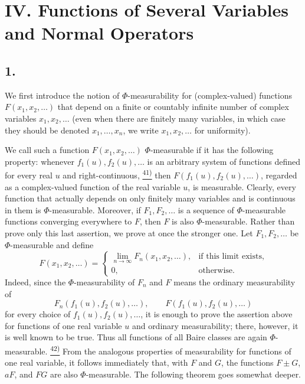 \documentclass[12pt,b5paper,twoside]{article}
\newcommand{\noteref}[1]{%
  \hyperlink{note:#1}{\textsuperscript{#1)}}}
\begin{document}
\section*{IV. Functions of Several Variables and Normal Operators}
\label{sec:IV}

\subsection*{1.}
\label{sec:IV.1}
We first introduce the notion of $\Phi$-measurability for (complex-valued) functions
$F(x_1,x_2,\ldots)$ that depend on a finite or countably infinite number of complex
variables $x_1,x_2,\ldots$ (even when there are finitely many variables, in which case
they should be denoted $x_1,\ldots,x_n$,
we write $x_1,x_2,\ldots$ for uniformity).

We call such a function $F(x_1,x_2,\ldots)$ $\Phi$-measurable if it has the following
property: whenever $f_1(u),f_2(u),\ldots$ is an arbitrary system of functions defined
for every real $u$ and right-continuous,\noteref{41} then
$F(f_1(u),f_2(u),\ldots)$, regarded as a complex-valued function of the real variable
$u$, is measurable.  Clearly, every function that actually depends on only finitely
many variables and is continuous in them is $\Phi$-measurable.  Moreover, if
$F_1,F_2,\ldots$ is a sequence of $\Phi$-measurable functions converging everywhere
to $F$, then $F$ is also $\Phi$-measurable.  Rather than prove only this last assertion,
we prove at once the stronger one.  Let $F_1,F_2,\ldots$ be $\Phi$-measurable and
define
\[
 F(x_1,x_2,\ldots)=
 \begin{cases}
   \displaystyle\lim_{n\to\infty}F_n(x_1,x_2,\ldots),
      & \text{if this limit exists},\\[2pt]
   0, & \text{otherwise}.
 \end{cases}
\]
Indeed, since the $\Phi$-measurability of $F_n$ and $F$ means the ordinary
measurability of
\[
 F_n(f_1(u),f_2(u),\ldots), \qquad F(f_1(u),f_2(u),\ldots)
\]
for every choice of $f_1(u),f_2(u),\ldots$, it is enough to prove the assertion above
for functions of one real variable $u$ and ordinary measurability; there, however, it
is well known to be true.  Thus all functions of all Baire classes are again
$\Phi$-measurable.\noteref{42}  From the analogous properties of measurability for
functions of one real variable, it follows immediately that, with $F$ and $G$, the
functions $F\pm G$, $aF$, and $FG$ are also $\Phi$-measurable.  The following theorem
goes somewhat deeper.
\end{document}
